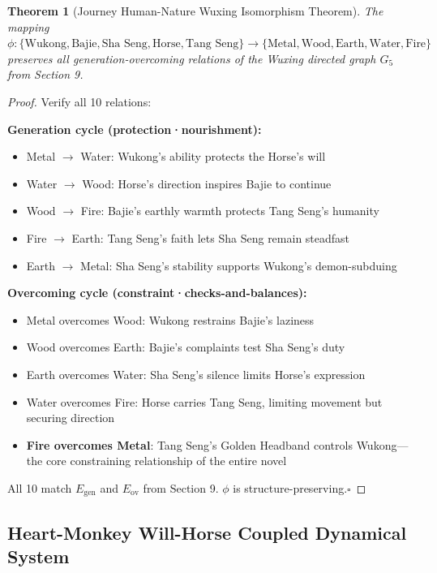 \documentclass[conference]{IEEEtran}
\newtheorem{theorem}{Theorem}[section]
\theoremstyle{remark}
\begin{document}
\begin{theorem}[Journey Human-Nature Wuxing Isomorphism Theorem]
The mapping $\phi: \{\text{Wukong}, \text{Bajie}, \text{Sha Seng}, \text{Horse}, \text{Tang Seng}\} \to \{\text{Metal}, \text{Wood}, \text{Earth}, \text{Water}, \text{Fire}\}$ preserves all generation-overcoming relations of the Wuxing directed graph $G_5$ from Section 9.
\end{theorem}
\begin{proof}
Verify all 10 relations:

\textbf{Generation cycle (protection·nourishment):}
\begin{itemize}[nosep]
\item Metal $\to$ Water: Wukong's ability protects the Horse's will
\item Water $\to$ Wood: Horse's direction inspires Bajie to continue
\item Wood $\to$ Fire: Bajie's earthly warmth protects Tang Seng's humanity
\item Fire $\to$ Earth: Tang Seng's faith lets Sha Seng remain steadfast
\item Earth $\to$ Metal: Sha Seng's stability supports Wukong's demon-subduing
\end{itemize}

\textbf{Overcoming cycle (constraint·checks-and-balances):}
\begin{itemize}[nosep]
\item Metal overcomes Wood: Wukong restrains Bajie's laziness
\item Wood overcomes Earth: Bajie's complaints test Sha Seng's duty
\item Earth overcomes Water: Sha Seng's silence limits Horse's expression
\item Water overcomes Fire: Horse carries Tang Seng, limiting movement but securing direction
\item \textbf{Fire overcomes Metal}: Tang Seng's Golden Headband controls Wukong---the core constraining relationship of the entire novel
\end{itemize}

All 10 match $E_{\text{gen}}$ and $E_{\text{ov}}$ from Section 9. $\phi$ is structure-preserving.\hfill$\square$
\end{proof}

\subsection{Heart-Monkey Will-Horse Coupled Dynamical System}
\end{document}
